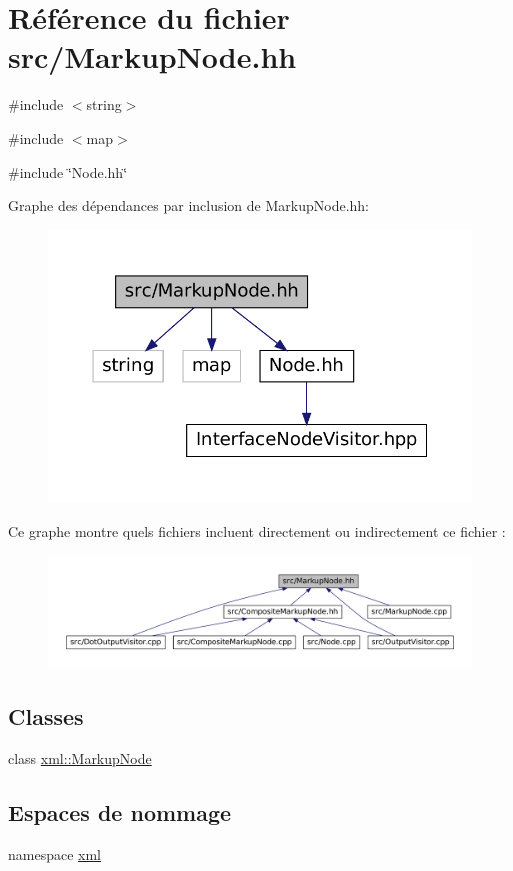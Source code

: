 \hypertarget{_markup_node_8hh}{
\section{Référence du fichier src/MarkupNode.hh}
\label{_markup_node_8hh}
}
{\ttfamily \#include $<$string$>$}\par
{\ttfamily \#include $<$map$>$}\par
{\ttfamily \#include \char`\"{}Node.hh\char`\"{}}\par
Graphe des dépendances par inclusion de MarkupNode.hh:
\nopagebreak
\begin{figure}[H]
\begin{center}
\leavevmode
\includegraphics[width=375pt]{_markup_node_8hh__incl}
\end{center}
\end{figure}
Ce graphe montre quels fichiers incluent directement ou indirectement ce fichier :
\nopagebreak
\begin{figure}[H]
\begin{center}
\leavevmode
\includegraphics[width=400pt]{_markup_node_8hh__dep__incl}
\end{center}
\end{figure}
\subsection*{Classes}
\begin{DoxyCompactItemize}
\item 
class \hyperlink{classxml_1_1_markup_node}{xml::MarkupNode}
\end{DoxyCompactItemize}
\subsection*{Espaces de nommage}
\begin{DoxyCompactItemize}
\item 
namespace \hyperlink{namespacexml}{xml}
\end{DoxyCompactItemize}
